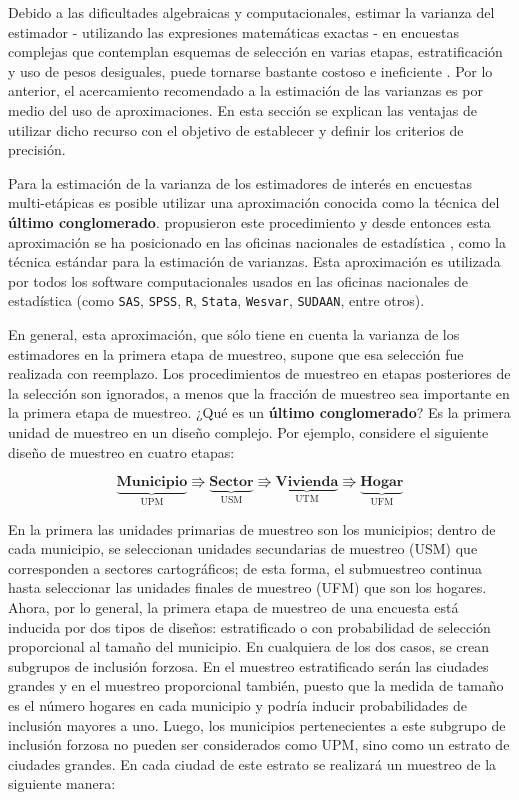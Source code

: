 \documentclass[12pt,spanish,]{book}
\begin{document}
Debido a las dificultades algebraicas y computacionales, estimar la varianza del estimador - utilizando las expresiones matemáticas exactas - en encuestas complejas que contemplan esquemas de selección en varias etapas, estratificación y uso de pesos desiguales, puede tornarse bastante costoso e ineficiente \autocite{Wolter_2007}. Por lo anterior, el acercamiento recomendado a la estimación de las varianzas es por medio del uso de aproximaciones. En esta sección se explican las ventajas de utilizar dicho recurso con el objetivo de establecer y definir los criterios de precisión.

Para la estimación de la varianza de los estimadores de interés en encuestas multi-etápicas es posible utilizar una aproximación conocida como la técnica del \textbf{último conglomerado}. \textcite{Hansen_Hurwitz_Madow_1953} propusieron este procedimiento y desde entonces esta aproximación se ha posicionado en las oficinas nacionales de estadística \autocite{West2012AccountingFM}, como la técnica estándar para la estimación de varianzas. Esta aproximación es utilizada por todos los software computacionales usados en las oficinas nacionales de estadística (como \texttt{SAS}, \texttt{SPSS}, \texttt{R}, \texttt{Stata}, \texttt{Wesvar}, \texttt{SUDAAN}, entre otros).

En general, esta aproximación, que sólo tiene en cuenta la varianza de los estimadores en la primera etapa de muestreo, supone que esa selección fue realizada con reemplazo. Los procedimientos de muestreo en etapas posteriores de la selección son ignorados, a menos que la fracción de muestreo sea importante en la primera etapa de muestreo. ¿Qué es un \textbf{último conglomerado}? Es la primera unidad de muestreo en un diseño complejo. Por ejemplo, considere el siguiente diseño de muestreo en cuatro etapas:

\begin{equation*}
\underbrace{\textbf{Municipio}}_{\text{UPM}} \Rrightarrow
\underbrace{\textbf{Sector}}_{\text{USM}} \Rrightarrow
\underbrace{\textbf{Vivienda}}_{\text{UTM}} \Rrightarrow
\underbrace{\textbf{Hogar}}_{\text{UFM}}
\end{equation*}

En la primera las unidades primarias de muestreo son los municipios; dentro de cada municipio, se seleccionan unidades secundarias de muestreo (USM) que corresponden a sectores cartográficos; de esta forma, el submuestreo continua hasta seleccionar las unidades finales de muestreo (UFM) que son los hogares. Ahora, por lo general, la primera etapa de muestreo de una encuesta está inducida por dos tipos de diseños: estratificado o con probabilidad de selección proporcional al tamaño del municipio. En cualquiera de los dos casos, se crean subgrupos de inclusión forzosa. En el muestreo estratificado serán las ciudades grandes y en el muestreo proporcional también, puesto que la medida de tamaño es el número hogares en cada municipio y podría inducir probabilidades de inclusión mayores a uno. Luego, los municipios pertenecientes a este subgrupo de inclusión forzosa no pueden ser considerados como UPM, sino como un estrato de ciudades grandes. En cada ciudad de este estrato se realizará un muestreo de la siguiente manera:
\end{document}

